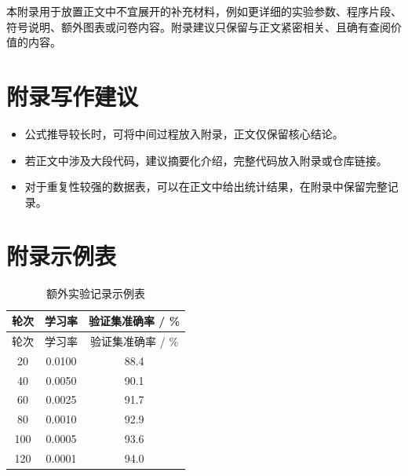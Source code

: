 本附录用于放置正文中不宜展开的补充材料，例如更详细的实验参数、程序片段、符号说明、额外图表或问卷内容。附录建议只保留与正文紧密相关、且确有查阅价值的内容。

\section{附录写作建议}

\begin{itemize}
  \item 公式推导较长时，可将中间过程放入附录，正文仅保留核心结论。
  \item 若正文中涉及大段代码，建议摘要化介绍，完整代码放入附录或仓库链接。
  \item 对于重复性较强的数据表，可以在正文中给出统计结果，在附录中保留完整记录。
\end{itemize}

\section{附录示例表}

\begin{longtable}{ccc}
  \caption{额外实验记录示例表}\label{tab:appendix-log}\\
  \toprule
  轮次 & 学习率 & 验证集准确率 / \% \\
  \midrule
  \endfirsthead
  \toprule
  轮次 & 学习率 & 验证集准确率 / \% \\
  \midrule
  \endhead
  20 & 0.0100 & 88.4 \\
  40 & 0.0050 & 90.1 \\
  60 & 0.0025 & 91.7 \\
  80 & 0.0010 & 92.9 \\
  100 & 0.0005 & 93.6 \\
  120 & 0.0001 & 94.0 \\
  \bottomrule
\end{longtable}
